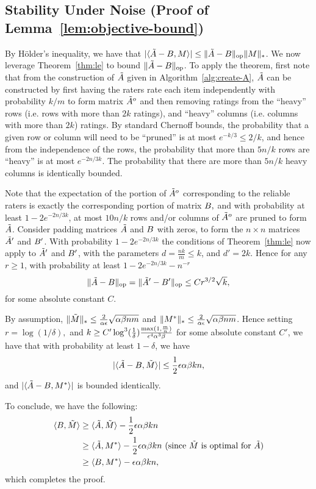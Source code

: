 \subsection{Stability Under Noise (Proof of Lemma~\ref{lem:objective-bound})}
\label{sec:objective-bound-proof}

By H\"{o}lder's inequality, we have that $|\langle \tilde{A}-B, M \rangle| \leq \|\tilde{A}-B\|_{\mathrm{op}}\|M\|_*$.   We now leverage Theorem~\ref{thm:le} to bound $\|\tilde{A}-B\|_{\mathrm{op}}$.  To apply the theorem, first note that from the construction of $\tilde{A}$ given in Algorithm~\ref{alg:create-A}, $\tilde{A}$ can be constructed by first having the raters rate each item independently with probability $k/m$ to form matrix $\tilde{A}^o$ and then removing ratings from the ``heavy'' rows (i.e. rows with more than $2k$ ratings), and ``heavy'' columns (i.e. columns with more than $2k$) ratings.  By standard Chernoff bounds, the probability that a given row or column will need to be ``pruned'' is at most $e^{-k/3} \le 2/k$, and hence from the independence of the rows, the probability that more than $5n/k$ rows are ``heavy'' is at most $e^{-2n/3k}$.  The probability that there are more than $5n/k$ heavy columns is identically bounded.

 Note that the expectation of the portion of $\tilde{A}^o$ corresponding to the reliable raters is exactly the corresponding portion of matrix $B,$ and with probability at least $1-2e^{-2n/3k}$, at most $10 n/k$ rows and/or columns of $\tilde{A}^o$ are pruned to form $\tilde{A}$.  Consider padding matrices $\tilde{A}$ and $B$ with zeros, to form the $n \times n$ matrices $\tilde{A}'$ and $B'$.   With probability $1-2e^{-2n/3k}$ the conditions of Theorem~\ref{thm:le} now apply to $\tilde{A}'$ and $B'$, with the parameters $d = \frac{n k}{m} \le k$, and $d' =  2k$.  Hence for any $r \ge 1$, with probability at least $1-2e^{-2n/3k} -n^{-r}$ $$\|\tilde{A}-B\|_{\mathrm{op}} = \|\tilde{A}'-B'\|_{\mathrm{op}} \le C r^{3/2} \sqrt{k},$$ for some absolute constant $C$.  

By assumption, $\|\tilde{M}\|_* \le \frac{2}{\alpha \epsilon}\sqrt{\alpha \beta n m}$ and $\|M^*\|_* \le \frac{2}{\alpha \epsilon}\sqrt{\alpha \beta n m}$.   Hence setting $r= \log (1/\delta),$ and $k \ge C' \log^3(\frac{1}{\delta}) \frac{\max (1,\frac{m}{n})}{\epsilon^4 \alpha^3 \beta}$ for some absolute constant $C'$, we have that with probability at least $1-\delta$, we have $$|\langle \tilde{A}-B, \tilde{M} \rangle|  \le \frac{1}{2} \epsilon \alpha \beta k n,$$ and $|\langle \tilde{A}-B, M^* \rangle|$ is bounded identically.

To conclude, we have the following:
\begin{align}
\langle B, \tilde{M} \rangle  &\geq \langle \tilde{A}, \tilde{M} \rangle - \frac{1}{2}\epsilon \alpha \beta k n \\
 &\geq \langle \tilde{A}, M^* \rangle - \frac{1}{2} \epsilon \alpha \beta k n \text{ (since $\tilde{M}$ is optimal for $\tilde{A}$)} \\
 &\geq \langle B, M^* \rangle - \epsilon \alpha \beta k n,
\end{align}
which completes the proof.


